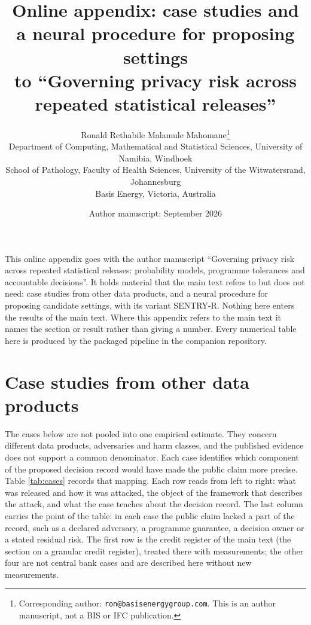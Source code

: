 \documentclass[11pt,a4paper]{article}
\title{\bfseries Online appendix: case studies and a neural procedure for proposing settings\\
\large to ``Governing privacy risk across repeated statistical releases''}
\author{Ronald Rethabile Malamule Mahomane\thanks{Corresponding author:
\texttt{ron@basisenergygroup.com}. This is an author manuscript, not a BIS or IFC publication.}\\
\small Department of Computing, Mathematical and Statistical Sciences,
University of Namibia, Windhoek\\
\small School of Pathology, Faculty of Health Sciences,
University of the Witwatersrand, Johannesburg\\
\small Basis Energy, Victoria, Australia}
\date{Author manuscript: September 2026}
\theoremstyle{plain}
\theoremstyle{definition}
\begin{document}
\maketitle

\noindent This online appendix goes with the author manuscript ``Governing privacy risk across repeated statistical releases: probability models, programme tolerances and accountable decisions''. It holds material that the main text refers to but does not need: case studies from other data products, and a neural procedure for proposing candidate settings, with its variant SENTRY-R. Nothing here enters the results of the main text. Where this appendix refers to the main text it names the section or result rather than giving a number. Every numerical table here is produced by the packaged pipeline in the companion repository.

\section{Case studies from other data products}\label{sec:cases}

The cases below are not pooled into one empirical estimate. They concern
different data products, adversaries and harm classes, and the published evidence
does not support a common denominator. Each case identifies which component of
the proposed decision record would have made the public claim more precise.
Table \ref{tab:cases} records that mapping. Each row reads from left to right:
what was released and how it was attacked, the object of the framework that
describes the attack, and what the case teaches about the decision record. The
last column carries the point of the table: in each case the public claim lacked
a part of the record, such as a declared adversary, a programme guarantee, a
decision owner or a stated residual risk. The first row is the credit register
of the main text (the section on a granular credit register), treated there with measurements; the
other four are not central bank cases and are described here without new
measurements.
\end{document}
